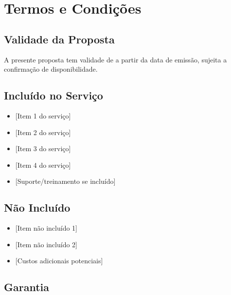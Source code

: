 \section{Termos e Condições}

\subsection{Validade da Proposta}

A presente proposta tem validade de  a partir da data de emissão, sujeita a confirmação de disponibilidade.

\subsection{Incluído no Serviço}

\begin{tcolorbox}[
    colback=prop-light,
    colframe=prop-primary,
    boxrule=0.5pt,
    arc=3pt,
    left=10pt, right=10pt, top=10pt, bottom=10pt
]
    \begin{itemize}
        \item {[Item 1 do serviço]}
        \item {[Item 2 do serviço]}
        \item {[Item 3 do serviço]}
        \item {[Item 4 do serviço]}
        \item {[Suporte/treinamento se incluído]}
    \end{itemize}
\end{tcolorbox}

\vskip 0.8cm

\subsection{Não Incluído}

\begin{itemize}
    \item {[Item não incluído 1]}
    \item {[Item não incluído 2]}
    \item {[Custos adicionais potenciais]}
\end{itemize}

\vskip 0.8cm

\subsection{Garantia}

